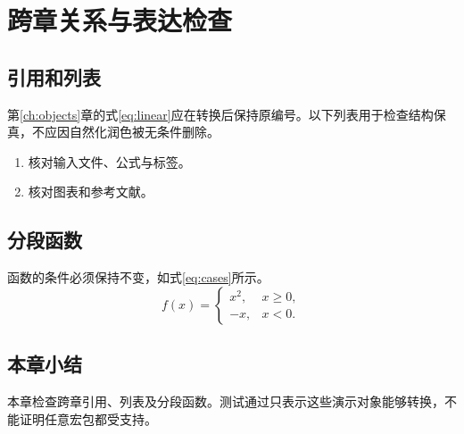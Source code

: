 \chapter{跨章关系与表达检查}\label{ch:checks}
\section{引用和列表}
第\ref{ch:objects}章的式\eqref{eq:linear}应在转换后保持原编号。以下列表用于检查结构保真，不应因自然化润色被无条件删除。
\begin{enumerate}
\item 核对输入文件、公式与标签。
\item 核对图表和参考文献。
\end{enumerate}
\section{分段函数}
函数的条件必须保持不变，如式\eqref{eq:cases}所示。
\begin{equation}\label{eq:cases}
f(x)=\begin{cases}x^2,&x\geq 0,\\-x,&x<0.\end{cases}
\end{equation}
\section{本章小结}
本章检查跨章引用、列表及分段函数。测试通过只表示这些演示对象能够转换，不能证明任意宏包都受支持。
